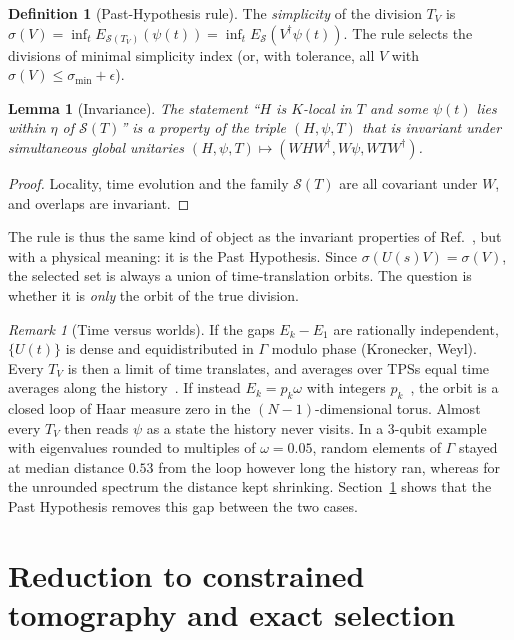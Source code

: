 \documentclass[11pt]{article}
\newtheorem{lemma}[theorem]{Lemma}
\theoremstyle{definition}
\newtheorem{definition}[theorem]{Definition}
\theoremstyle{remark}
\newtheorem{remark}[theorem]{Remark}
\begin{document}
\begin{definition}[Past-Hypothesis rule]\label{def:rule}
The \emph{simplicity} of the division $T_V$ is $\sigma(V)=\inf_t E_{\mathcal S(T_V)}(\psi(t))=\inf_t E_{\mathcal S}(V^\dagger\psi(t))$. The rule selects the divisions of minimal simplicity index (or, with tolerance, all $V$ with $\sigma(V)\le\sigma_{\min}+\epsilon$).
\end{definition}

\begin{lemma}[Invariance]\label{lem:invariance}
The statement ``$H$ is $K$-local in $T$ and some $\psi(t)$ lies within $\eta$ of $\mathcal{S}(T)$'' is a property of the triple $(H,\psi,T)$ that is invariant under simultaneous global unitaries $(H,\psi,T)\mapsto(WHW^\dagger,W\psi,WTW^\dagger)$.
\end{lemma}
\begin{proof}
Locality, time evolution and the family $\mathcal S(T)$ are all covariant under $W$, and overlaps are invariant.
\end{proof}

The rule is thus the same kind of object as the invariant properties of Ref.~\cite{Soulas2025}, but with a physical meaning: it is the Past Hypothesis. Since $\sigma(U(s)V)=\sigma(V)$, the selected set is always a union of time-translation orbits. The question is whether it is \emph{only} the orbit of the true division.

\begin{remark}[Time versus worlds]\label{rem:time}
If the gaps $E_k-E_1$ are rationally independent, $\{U(t)\}$ is dense and equidistributed in $\Gamma$ modulo phase (Kronecker, Weyl). Every $T_V$ is then a limit of time translates, and averages over TPSs equal time averages along the history~\cite[Remark~11]{Stoica2022}. If instead $E_k=p_k\omega$ with integers $p_k$~\cite{CDD2026}, the orbit is a closed loop of Haar measure zero in the $(N-1)$-dimensional torus. Almost every $T_V$ then reads $\psi$ as a state the history never visits. In a 3-qubit example with eigenvalues rounded to multiples of $\omega=0.05$, random elements of $\Gamma$ stayed at median distance $0.53$ from the loop however long the history ran, whereas for the unrounded spectrum the distance kept shrinking. Section~\ref{sec:reduction} shows that the Past Hypothesis removes this gap between the two cases.
\end{remark}
\section{Reduction to constrained tomography and exact selection}
\label{sec:reduction}
\end{document}
